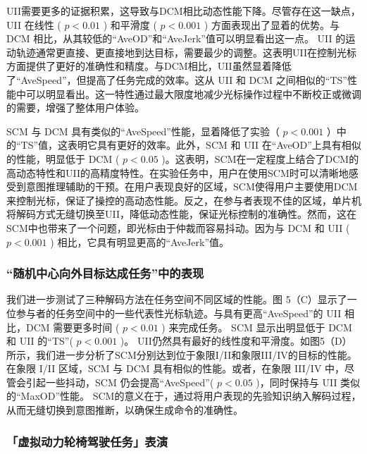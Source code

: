 UII需要更多的证据积累，这导致与DCM相比动态性能下降。尽管存在这一缺点，UII 在线性 (    $p<0.01$    ) 和平滑度 (    $p<0.001$    ) 方面表现出了显着的优势。与 DCM 相比，从其较低的“AveOD”和“AveJerk”值可以明显看出这一点。 UII 的运动轨迹通常更直接、更直接地到达目标，需要最少的调整。这表明UII在控制光标方面提供了更好的准确性和精度。与DCM相比，UII虽然显着降低了“AveSpeed”，但提高了任务完成的效率。这从 UII 和 DCM 之间相似的“TS”性能中可以明显看出。这一特性通过最大限度地减少光标操作过程中不断校正或微调的需要，增强了整体用户体验。  

SCM 与 DCM 具有类似的“AveSpeed”性能，显着降低了实验（    $p<0.001$    ）中的“TS”值，这表明它具有更好的效率。此外，SCM 和 UII 在“AveOD”上具有相似的性能，明显低于 DCM (    $p<0.05$    )。这表明，SCM在一定程度上结合了DCM的高动态特性和UII的高精度特性。在实验任务中，用户在使用SCM时可以清晰地感受到意图推理辅助的干预。在用户表现良好的区域，SCM使得用户主要使用DCM来控制光标，保证了操控的高动态性能。反之，在参与者表现不佳的区域，单片机将解码方式无缝切换至UII，降低动态性能，保证光标控制的准确性。然而，这在SCM中也带来了一个问题，即光标由于仲裁而容易抖动。因为与 DCM 和 UII (    $p<0.001$    ) 相比，它具有明显更高的“AveJerk”值。  

\subsubsection{“随机中心向外目标达成任务”中的表现  }    我们进一步测试了三种解码方法在任务空间不同区域的性能。图 5（C）显示了一位参与者的任务空间中的一些代表性光标轨迹。与具有更高“AveSpeed”的 UII 相比，DCM 需要更多时间 (    $p<0.01$    ) 来完成任务。 SCM 显示出明显低于 DCM 和 UII 的“TS”(    $p<0.001$    )。 UII仍然具有最好的线性度和平滑度。如图5（D）所示，我们进一步分析了SCM分别达到位于象限I/II和象限III/IV的目标的性能。在象限 I/II 区域，SCM 与 DCM 具有相似的性能。或者，在象限 III/IV 中，尽管会引起一些抖动，SCM 仍会提高“AveSpeed”(   $p<0.05$   )，同时保持与 UII 类似的“MaxOD”性能。 SCM的意义在于，通过将用户表现的先验知识纳入解码过程，从而无缝切换到意图推断，以确保生成命令的准确性。  

\subsubsection{「虚拟动力轮椅驾驶任务」表演  }     



